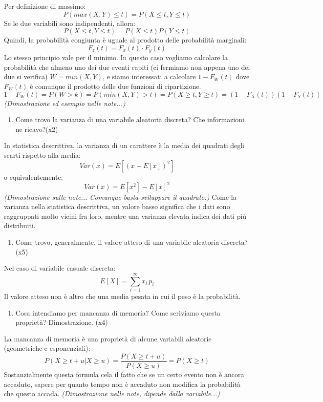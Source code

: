 Per definizione di massimo:
\[P(max(X,Y) \le t)=P(X\le t,Y \le t)
\]
Se le due variabili sono indipendenti, allora:
\[P(X\le t,Y \le t) = P(X \le t) P(Y \le t)\]
Quindi, la probabilità congiunta è uguale al prodotto delle probabilità marginali:
\[F_z(t) = F_x(t) \cdot F_y(t)\]
Lo stesso principio vale per il minimo. In questo caso vogliamo calcolare la probabilità che almeno uno dei due eventi capiti (ci fermiamo non appena uno dei due si verifica)\newline
$W = min(X,Y)$, e siamo interessati a calcolare $1 - F_W(t) $ dove $F_W(t)$ è comunque il prodotto delle due funzioni di ripartizione.
\[1 - F_W(t) = P(W > k) = P(min(X,Y) > t) =P(X\ge t,Y \ge t) = (1-F_X(t)) (1- F_Y(t))\]
\textit{(Dimostrazione ed esempio nelle note...)}
\begin{enumerate}[resume]\bfseries
\item Come trovo la varianza di una variabile aleatoria discreta? Che informazioni ne ricavo?(x2)
\end{enumerate}
In statistica descrittiva, la varianza di un carattere è la media dei quadrati degli scarti rispetto alla media:
\[ Var(x) = E[(x - E[x])^2]\]
o equivalentemente:
\[Var(x) = E[x^2] - E[x]^2\]
\textit{(Dimostrazione sulle note... Comunque basta sviluppare il quadrato.)}\newline
Come la varianza nella statistica descrittiva, un valore basso significa che i dati sono raggruppati molto vicini fra loro, mentre una varianza elevata indica dei dati più distribuiti.
\begin{enumerate}[resume]\bfseries
\item Come trovo, generalmente, il valore atteso di una variabile aleatoria discreta? (x5)
\end{enumerate}
Nel caso di variabile casuale discreta:
\[ E[X]=\sum _{i=1}^{\infty }x_{i}\,p_{i}\]
Il valore atteso non è altro che una media pesata in cui il peso è la probabilità.
\begin{enumerate}[resume]\bfseries
\item Cosa intendiamo per mancanza di memoria? Come scriviamo questa proprietà? Dimostrazione. (x4)
\end{enumerate}
La mancanza di memoria è una proprietà di alcune variabili aleatorie (geometriche e esponenziali):
\[P(X \ge t+u|X \ge u)={\frac {P(X \ge t+u)}{P(X \ge u)}}=P(X \ge t)\]
Sostanzialmente questa formula cela il fatto che se un certo evento non è ancora accaduto, sapere per quanto tempo non è accaduto non modifica la probabilità che questo accada.
\textit{(Dimostrazione nelle note, dipende dalla variabile...)}
